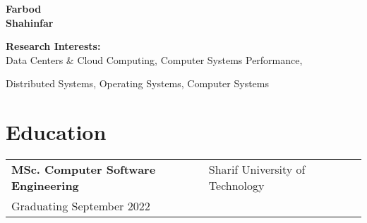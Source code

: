 \documentclass[11pt]{article}
\makeatletter
\newcommand{\eduSmall}[4] {
    \begin{table}[h!]
        \begin{tabular*}{\textwidth}{ll@{\extracolsep{\fill}}r}
            \textbf{#1} &  #2 & \\ %
            #3 &  &
        \end{tabular*}
    \end{table}
    }
\makeatother
\begin{document}
{
    \begin{minipage}[t]{3.5cm}
        \vspace{8mm}
        \noindent
        \huge\bfseries
        Farbod\\
        Shahinfar
        \vspace{0.0cm}
    \end{minipage}
    \null\hfill
    \begin{minipage}[t]{0.5\textwidth}
        
    \end{minipage}

}



%

\noindent\textbf{Research Interests:} \\
\indent Data Centers \& Cloud Computing, Computer Systems Performance,

Distributed Systems, Operating Systems, Computer Systems


\section{Education}
\eduSmall{MSc. Computer Software Engineering}{Sharif University of Technology}{Graduating September 2022}{images/sharif.png}
\vspace{-5mm}
\end{document}
